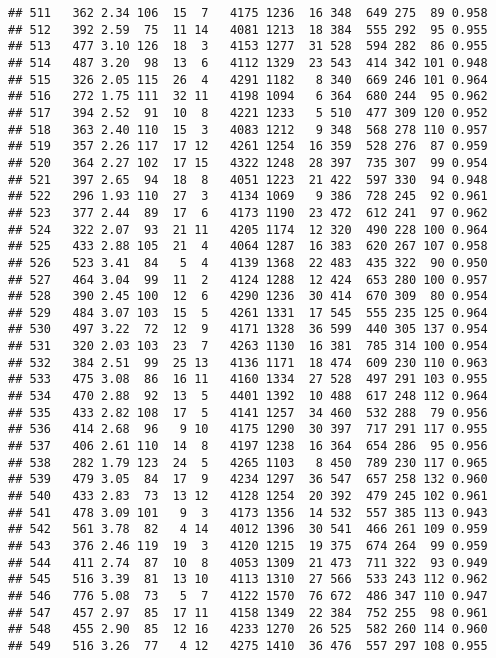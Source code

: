 \documentclass[]{article}
\begin{document}
\begin{verbatim}
## 511   362 2.34 106  15  7   4175 1236  16 348  649 275  89 0.958
## 512   392 2.59  75  11 14   4081 1213  18 384  555 292  95 0.955
## 513   477 3.10 126  18  3   4153 1277  31 528  594 282  86 0.955
## 514   487 3.20  98  13  6   4112 1329  23 543  414 342 101 0.948
## 515   326 2.05 115  26  4   4291 1182   8 340  669 246 101 0.964
## 516   272 1.75 111  32 11   4198 1094   6 364  680 244  95 0.962
## 517   394 2.52  91  10  8   4221 1233   5 510  477 309 120 0.952
## 518   363 2.40 110  15  3   4083 1212   9 348  568 278 110 0.957
## 519   357 2.26 117  17 12   4261 1254  16 359  528 276  87 0.959
## 520   364 2.27 102  17 15   4322 1248  28 397  735 307  99 0.954
## 521   397 2.65  94  18  8   4051 1223  21 422  597 330  94 0.948
## 522   296 1.93 110  27  3   4134 1069   9 386  728 245  92 0.961
## 523   377 2.44  89  17  6   4173 1190  23 472  612 241  97 0.962
## 524   322 2.07  93  21 11   4205 1174  12 320  490 228 100 0.964
## 525   433 2.88 105  21  4   4064 1287  16 383  620 267 107 0.958
## 526   523 3.41  84   5  4   4139 1368  22 483  435 322  90 0.950
## 527   464 3.04  99  11  2   4124 1288  12 424  653 280 100 0.957
## 528   390 2.45 100  12  6   4290 1236  30 414  670 309  80 0.954
## 529   484 3.07 103  15  5   4261 1331  17 545  555 235 125 0.964
## 530   497 3.22  72  12  9   4171 1328  36 599  440 305 137 0.954
## 531   320 2.03 103  23  7   4263 1130  16 381  785 314 100 0.954
## 532   384 2.51  99  25 13   4136 1171  18 474  609 230 110 0.963
## 533   475 3.08  86  16 11   4160 1334  27 528  497 291 103 0.955
## 534   470 2.88  92  13  5   4401 1392  10 488  617 248 112 0.964
## 535   433 2.82 108  17  5   4141 1257  34 460  532 288  79 0.956
## 536   414 2.68  96   9 10   4175 1290  30 397  717 291 117 0.955
## 537   406 2.61 110  14  8   4197 1238  16 364  654 286  95 0.956
## 538   282 1.79 123  24  5   4265 1103   8 450  789 230 117 0.965
## 539   479 3.05  84  17  9   4234 1297  36 547  657 258 132 0.960
## 540   433 2.83  73  13 12   4128 1254  20 392  479 245 102 0.961
## 541   478 3.09 101   9  3   4173 1356  14 532  557 385 113 0.943
## 542   561 3.78  82   4 14   4012 1396  30 541  466 261 109 0.959
## 543   376 2.46 119  19  3   4120 1215  19 375  674 264  99 0.959
## 544   411 2.74  87  10  8   4053 1309  21 473  711 322  93 0.949
## 545   516 3.39  81  13 10   4113 1310  27 566  533 243 112 0.962
## 546   776 5.08  73   5  7   4122 1570  76 672  486 347 110 0.947
## 547   457 2.97  85  17 11   4158 1349  22 384  752 255  98 0.961
## 548   455 2.90  85  12 16   4233 1270  26 525  582 260 114 0.960
## 549   516 3.26  77   4 12   4275 1410  36 476  557 297 108 0.955

\end{verbatim}
\end{document}
